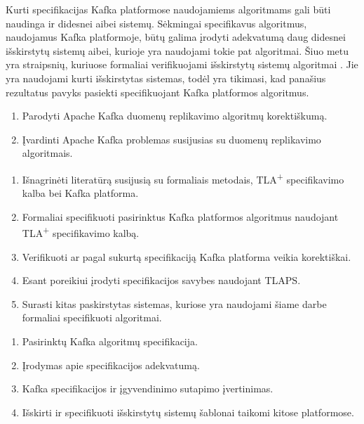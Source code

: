 \documentclass{VUMIFPSmagistrinis}
\begin{document}
		
		Kurti specifikacijas Kafka platformose naudojamiems algoritmams gali būti naudinga ir didesnei aibei sistemų. 
		Sėkmingai specifikavus algoritmus, naudojamus Kafka platformoje, būtų galima įrodyti adekvatumą daug didesnei išskirstytų sistemų aibei, kurioje yra naudojami tokie pat algoritmai. 
		Šiuo metu yra straipsnių, kuriuose formaliai verifikuojami išskirstytų sistemų algoritmai \cite{lamport2005generalized}. Jie yra naudojami kurti išskirstytas sistemas, todėl yra tikimasi, kad panašius rezultatus pavyks pasiekti specifikuojant Kafka platformos algoritmus.
	
		\begin{enumerate}
			\item{Parodyti Apache Kafka duomenų replikavimo algoritmų korektiškumą.}
			\item{Įvardinti Apache Kafka problemas susijusias su duomenų replikavimo algoritmais.}
		\end{enumerate}	

	
		\begin{enumerate}
			\item{Išnagrinėti literatūrą susijusią su formaliais metodais, TLA\textsuperscript{+} specifikavimo kalba bei Kafka platforma.}
			\item{Formaliai specifikuoti pasirinktus Kafka platformos algoritmus naudojant TLA\textsuperscript{+} specifikavimo kalbą.}
			\item{Verifikuoti ar pagal sukurtą specifikaciją Kafka platforma veikia korektiškai.}
			\item{Esant poreikiui įrodyti specifikacijos savybes naudojant TLAPS.}
			\item{Surasti kitas paskirstytas sistemas, kuriose yra naudojami šiame darbe formaliai specifikuoti algoritmai.}
		\end{enumerate}
	
		\begin{enumerate}
			\item{Pasirinktų Kafka algoritmų specifikacija.}
			\item{Įrodymas apie specifikacijos adekvatumą.}
			\item{Kafka
 specifikacijos ir įgyvendinimo sutapimo įvertinimas.}
			\item{Išskirti ir specifikuoti išskirstytų sistemų šablonai taikomi kitose platformose.}
		\end{enumerate}
	\pagebreak
	\printbibliography[heading=bibintoc] 
\end{document}
